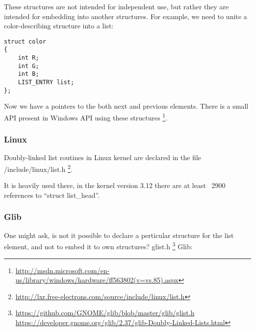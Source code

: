{These structures are not intended for independent use, but rather they are intended for embedding
into another structures}.
{For example, we need to unite a color-describing structure into a list}:

\begin{lstlisting}
struct color
{
	int R;
	int G;
	int B;
	LIST_ENTRY list;
};
\end{lstlisting}

{Now we have a pointers to the both next and previous elements}.
{There is a small API present in Windows API using these structures}
\footnote{\url{http://msdn.microsoft.com/en-us/library/windows/hardware/ff563802(v=vs.85).aspx}}.

\subsubsection{Linux}

{Doubly-linked list routines in Linux kernel are declared in the file} /include/linux/list.h
\footnote{\url{http://lxr.free-electrons.com/source/include/linux/list.h}}.

{It is heavily used there, in the kernel version 3.12 there are at least ~2900 references to} 
``struct list\_head''.

\subsubsection{Glib}

{One might ask, is not it possible to declare a perticular structure for the list element,
and not to embed it to own structures}?
 glist.h
\footnote{\url{https://github.com/GNOME/glib/blob/master/glib/glist.h} 
\url{https://developer.gnome.org/glib/2.37/glib-Doubly-Linked-Lists.html}} \InENRU Glib:

